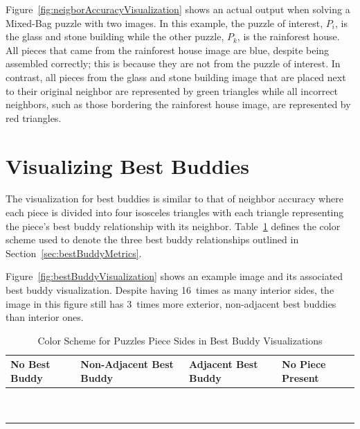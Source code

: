 Figure~\ref{fig:neigborAccuracyVisualization} shows an actual output when solving a Mixed-Bag puzzle with two images.  In this example, the puzzle of interest, $P_i$, is the glass and stone building while the other puzzle, $P_k$, is the rainforest house.  All pieces that came from the rainforest house image are blue, despite being assembled correctly; this is because they are not from the puzzle of interest.  In contrast, all pieces from the glass and stone building image that are placed next to their original neighbor are represented by green triangles while all incorrect neighbors, such as those bordering the rainforest house image, are represented by red triangles.

\section{Visualizing Best Buddies}\label{sec:visualizingBestBuddies}

The visualization for best buddies is similar to that of neighbor accuracy where each piece is divided into four isosceles triangles with each triangle representing the piece's best buddy relationship with its neighbor.  Table~\ref{tab:bestBuddyColors} defines the color scheme used to denote the three best buddy relationships outlined in Section~\ref{sec:bestBuddyMetrics}.  

Figure~\ref{fig:bestBuddyVisualization} shows an example image and its associated best buddy visualization.  Despite having 16~times as many interior sides, the image in this figure still has 3~times more exterior, non-adjacent best buddies than interior ones.

\begin{table}[tb]
\begin{center}
  \caption{Color Scheme for Puzzles Piece Sides in Best Buddy Visualizations}\label{tab:bestBuddyColors}
  \begin{tabular}{ | >{\centering\arraybackslash}m{1.0in} | >{\centering\arraybackslash}m{1.0in} | >{\centering\arraybackslash}m{1.0in} | >{\centering\arraybackslash}m{1.0in} | }
  
   \hline
    No Best Buddy & Non-Adjacent Best Buddy & Adjacent Best Buddy & No Piece Present  \\ \hline
	{\cellcolor{white}~} & {\cellcolor{red}~} & {\cellcolor{green}~} & {\cellcolor{black}~}  \\
	{\cellcolor{white}~} & {\cellcolor{red}~} & {\cellcolor{green}~} & {\cellcolor{black}~}  \\
 \hline

  \end{tabular}
\end{center}
\end{table}


